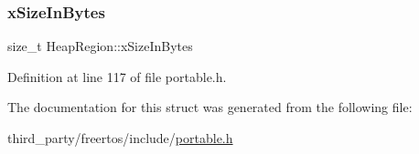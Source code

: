 \subsubsection{\texorpdfstring{x\+Size\+In\+Bytes}{xSizeInBytes}}
{\footnotesize\ttfamily size\+\_\+t Heap\+Region\+::x\+Size\+In\+Bytes}



Definition at line 117 of file portable.\+h.



The documentation for this struct was generated from the following file\+:\begin{DoxyCompactItemize}
\item 
third\+\_\+party/freertos/include/\hyperlink{portable_8h}{portable.\+h}\end{DoxyCompactItemize}
